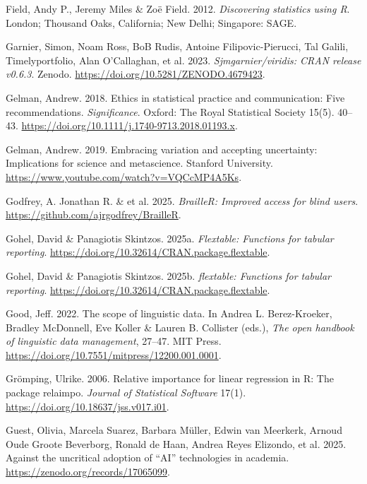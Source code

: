 \documentclass[
  letterpaper,
  DIV=11,
  numbers=noendperiod]{scrreprt}
\newlength{\cslhangindent}
\newenvironment{CSLReferences}[2] %
 {\begin{list}{}{%
  \setlength{\itemindent}{0pt}
  \setlength{\leftmargin}{0pt}
  \setlength{\parsep}{0pt}
  \ifodd #1
   \setlength{\leftmargin}{\cslhangindent}
   \setlength{\itemindent}{-1\cslhangindent}
  \fi
  \setlength{\itemsep}{#2\baselineskip}}}
 {\end{list}}
\begin{document}
\begin{CSLReferences}{1}{0}
Field, Andy P., Jeremy Miles \& Zoë Field. 2012. \emph{Discovering
statistics using {R}}. London; Thousand Oaks, California; New Delhi;
Singapore: SAGE.

{Garnier, Simon, Noam Ross, BoB Rudis, Antoine Filipovic-Pierucci, Tal
Galili, Timelyportfolio, Alan O'Callaghan, et al.} 2023.
\emph{Sjmgarnier/viridis: CRAN release v0.6.3}. Zenodo.
\url{https://doi.org/10.5281/ZENODO.4679423}.

Gelman, Andrew. 2018. Ethics in statistical practice and communication:
Five recommendations. \emph{Significance}. Oxford: The Royal Statistical
Society 15(5). 40--43.
\url{https://doi.org/10.1111/j.1740-9713.2018.01193.x}.

Gelman, Andrew. 2019. Embracing variation and accepting uncertainty:
Implications for science and metascience. Stanford University.
\url{https://www.youtube.com/watch?v=VQCcMP4A5Ks}.

{Godfrey, A. Jonathan R. \& et al.} 2025. \emph{BrailleR: Improved
access for blind users}. \url{https://github.com/ajrgodfrey/BrailleR}.

Gohel, David \& Panagiotis Skintzos. 2025a. \emph{Flextable: Functions
for tabular reporting}.
\url{https://doi.org/10.32614/CRAN.package.flextable}.

Gohel, David \& Panagiotis Skintzos. 2025b. \emph{{flextable}: Functions
for tabular reporting}.
\url{https://doi.org/10.32614/CRAN.package.flextable}.

Good, Jeff. 2022. The scope of linguistic data. In Andrea L.
Berez-Kroeker, Bradley McDonnell, Eve Koller \& Lauren B. Collister
(eds.), \emph{The open handbook of linguistic data management}, 27--47.
MIT Press. \url{https://doi.org/10.7551/mitpress/12200.001.0001}.

Grömping, Ulrike. 2006. Relative importance for linear regression in
{R}: The package relaimpo. \emph{Journal of Statistical Software} 17(1).
\url{https://doi.org/10.18637/jss.v017.i01}.

{Guest, Olivia, Marcela Suarez, Barbara Müller, Edwin van Meerkerk,
Arnoud Oude Groote Beverborg, Ronald de Haan, Andrea Reyes Elizondo, et
al.} 2025. Against the uncritical adoption of {``AI''} technologies in
academia. \url{https://zenodo.org/records/17065099}.


\end{CSLReferences}
\end{document}
